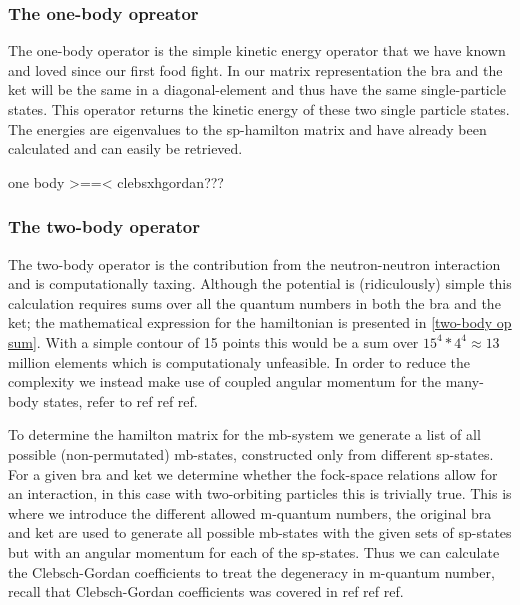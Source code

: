 \subsubsection{The one-body opreator}
The one-body operator is the simple kinetic energy operator that we have known and loved since our first food fight. 
 In our matrix representation the bra and the ket will be the same in a diagonal-element and thus have the same single-particle states.
 This operator returns the kinetic energy of these two single particle states. 
 The energies are eigenvalues to the sp-hamilton matrix and have already been calculated and can easily be retrieved.

one body >==< clebsxhgordan???

\subsubsection{The two-body operator}
The two-body operator is the contribution from the neutron-neutron interaction and is computationally taxing. Although the potential is (ridiculously) simple this calculation requires sums over all the quantum numbers in both the bra and the ket; the mathematical expression for the hamiltonian is presented in \cref{two-body op sum}. 
With a simple contour of 15 points this would be a sum over $15^4*4^4 \approx 13$ million elements which is computationaly unfeasible.
In order to reduce the complexity we instead make use of coupled angular momentum for the many-body states, refer to ref ref ref.



To determine the hamilton matrix for the mb-system we generate a list of all possible (non-permutated) mb-states, constructed only from different sp-states.
For a given bra and ket we determine whether the fock-space relations allow for an interaction, in this case with two-orbiting particles this is trivially true.
This is where we introduce the different allowed m-quantum numbers, the original bra and ket are used to generate all possible mb-states with the given sets of sp-states but with an angular momentum for each of the sp-states.
Thus we can calculate the Clebsch-Gordan coefficients to treat the degeneracy in m-quantum number, recall that Clebsch-Gordan coefficients was covered in ref ref ref.

